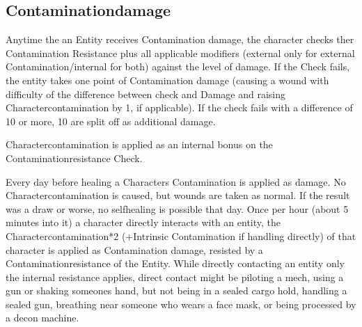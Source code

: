 \subsection{Contaminationdamage}
Anytime the an Entity receives Contamination damage, the character checks ther Contamination
Resistance plus all applicable modifiers (external only for external Contamination/internal for both) against the
level of damage.
If the Check fails, the entity takes one point of Contamination damage (causing a wound with
difficulty of the difference between check and Damage and raising Charactercontamination by 1, if applicable).
If the check fails with a difference of 10 or more, 10 are split off as additional damage. \par
Charactercontamination is applied as an internal bonus on the Contaminationresistance Check. \par
Every day before healing a Characters Contamination is applied as damage.
No Charactercontamination is caused,
but wounds are taken as normal.
If the result was a draw or worse, no selfhealing is possible that day.
Once per hour (about 5 minutes into it) a character directly interacts with an entity, the Charactercontamination*2
(+Intrinsic Contamination if handling directly) of that character is applied as Contamination damage,
resisted by a Contaminationresistance of the Entity.
While directly contacting an entity only the internal
resistance applies, direct contact might be piloting a mech, using a gun or shaking someones hand, but not being in
a sealed cargo hold, handling a sealed gun, breathing near someone who wears a face mask, or being processed
by a decon machine.
